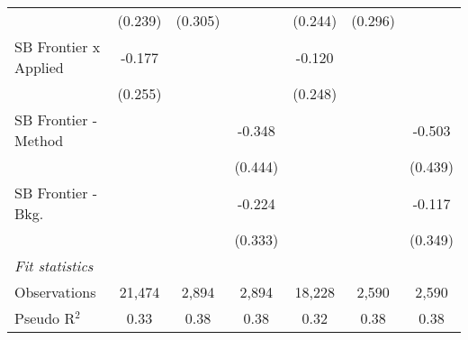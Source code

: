 \begin{tabular}{lcccccc}
                                  & (0.239)       & (0.305)        &               & (0.244)      & (0.296)        &   \\   
   SB Frontier x Applied          & -0.177        &                &               & -0.120       &                &   \\   
                                  & (0.255)       &                &               & (0.248)      &                &   \\   
   SB Frontier - Method           &               &                & -0.348        &              &                & -0.503\\   
                                  &               &                & (0.444)       &              &                & (0.439)\\   
   SB Frontier - Bkg.             &               &                & -0.224        &              &                & -0.117\\   
                                  &               &                & (0.333)       &              &                & (0.349)\\   
   \midrule
   \emph{Fit statistics}\\
   Observations                   & 21,474        & 2,894          & 2,894         & 18,228       & 2,590          & 2,590\\  
   Pseudo R$^2$                   & 0.33          & 0.38           & 0.38          & 0.32         & 0.38           & 0.38\\  
   

\end{tabular}
